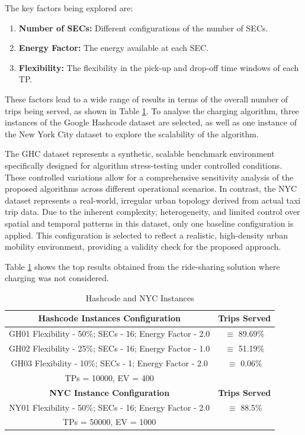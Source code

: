 The key factors being explored are:
\begin{enumerate}
    \item \textbf{Number of SECs:} Different configurations of the number of SECs.
    \item \textbf{Energy Factor:} The energy available at each SEC.
    \item \textbf{Flexibility:} The flexibility in the pick-up and drop-off time windows of each TP.
\end{enumerate}

These factors lead to a wide range of results in terms of the overall number of trips being served, as shown in Table \ref{tab:datasets}. To analyse the charging algorithm, three instances of the Google Hashcode dataset are selected, as well as one instance of the New York City dataset to explore the scalability of the algorithm. 

The GHC dataset represents a synthetic, scalable benchmark environment specifically designed for algorithm stress-testing under controlled conditions. These controlled variations allow for a comprehensive sensitivity analysis of the proposed algorithms across different operational scenarios. In contrast, the NYC dataset represents a real-world, irregular urban topology derived from actual taxi trip data. Due to the inherent complexity, heterogeneity, and limited control over spatial and temporal patterns in this dataset, only one baseline configuration is applied. This configuration is selected to reflect a realistic, high-density urban mobility environment, providing a validity check for the proposed approach.

Table \ref{tab:datasets} shows the top results obtained from the \cite{smartgreens} ride-sharing solution where charging was not considered. 


\begin{table}[htbp]
\caption{Hashcode and NYC Instances}
\begin{center}
\begin{tabular}{|c|c|}
\hline
\textbf{Hashcode Instances Configuration}&\textbf{Trips Served}\\
\hline
GH01 Flexibility - 50\%; SECs - 16; Energy Factor - 2.0 & $\equiv$ 89.69\% \\
GH02 Flexibility - 25\%; SECs - 16; Energy Factor - 1.0 & $\equiv$ 51.19\% \\
GH03 Flexibility - 10\%; SECs - 1; Energy Factor - 2.0 & $\equiv$ 0.06\% \\
TPs = 10000, EV = 400 & \\
\hline
\textbf{NYC Instance Configuration}&\textbf{Trips Served}\\
\hline
NY01 Flexibility - 50\%; SECs - 16; Energy Factor - 2.0 & $\equiv$ 88.5\% \\
TPs = 50000, EV = 1000 & \\
\hline
\end{tabular}
\label{tab:datasets}
\end{center}
\end{table}


